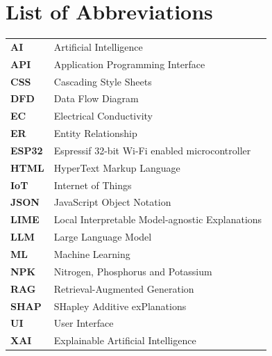 \chapter*{List of Abbreviations}
\begin{singlespace}
\begin{longtable}{p{3cm} p{10.3cm}}

\textbf{AI} & Artificial Intelligence\\[3pt]
\textbf{API} & Application Programming Interface\\[3pt]
\textbf{CSS} & Cascading Style Sheets\\[3pt]
\textbf{DFD} & Data Flow Diagram\\[3pt]
\textbf{EC} & Electrical Conductivity\\[3pt]
\textbf{ER} & Entity Relationship\\[3pt]
\textbf{ESP32} & Espressif 32-bit Wi-Fi enabled microcontroller\\[3pt]
\textbf{HTML} & HyperText Markup Language\\[3pt]
\textbf{IoT} & Internet of Things\\[3pt]
\textbf{JSON} & JavaScript Object Notation\\[3pt]
\textbf{LIME} & Local Interpretable Model-agnostic Explanations\\[3pt]
\textbf{LLM} & Large Language Model\\[3pt]
\textbf{ML} & Machine Learning\\[3pt]
\textbf{NPK} & Nitrogen, Phosphorus and Potassium\\[3pt]
\textbf{RAG} & Retrieval-Augmented Generation\\[3pt]
\textbf{SHAP} & SHapley Additive exPlanations\\[3pt]
\textbf{UI} & User Interface\\[3pt]
\textbf{XAI} & Explainable Artificial Intelligence\\

\end{longtable}
\end{singlespace}